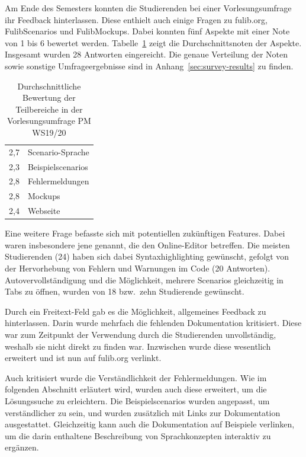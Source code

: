 Am Ende des Semesters konnten die Studierenden bei einer Vorlesungsumfrage ihr Feedback hinterlassen.
Diese enthielt auch einige Fragen zu fulib.org, FulibScenarios und FulibMockups.
Dabei konnten fünf Aspekte mit einer Note von 1 bis 6 bewertet werden.
Tabelle~\ref{tab:survey-results} zeigt die Durchschnittsnoten der Aspekte.
Insgesamt wurden 28 Antworten eingereicht.
Die genaue Verteilung der Noten sowie sonstige Umfrageergebnisse sind in Anhang~\ref{sec:survey-results} zu finden.

\begin{table}
    \caption{Durchschnittliche Bewertung der Teilbereiche in der Vorlesungsumfrage PM WS19/20}
    \label{tab:survey-results}
    \centering
    \begin{tabular}{rl}
        \toprule
        2,7 & Scenario-Sprache \\
        2,3 & Beispielscenarios \\
        2,8 & Fehlermeldungen \\
        2,8 & Mockups \\
        2,4 & Webseite \\
        \bottomrule
    \end{tabular}
\end{table}

Eine weitere Frage befasste sich mit potentiellen zukünftigen Features.
Dabei waren insbesondere jene genannt, die den Online-Editor betreffen.
Die meisten Studierenden (24) haben sich dabei Syntaxhighlighting gewünscht,
gefolgt von der Hervorhebung von Fehlern und Warnungen im Code (20 Antworten).
Autovervollständigung und die Möglichkeit, mehrere Scenarios gleichzeitig in Tabs zu öffnen,
wurden von 18 bzw.\ zehn Studierende gewünscht.

Durch ein Freitext-Feld gab es die Möglichkeit, allgemeines Feedback zu hinterlassen.
Darin wurde mehrfach die fehlenden Dokumentation kritisiert.
Diese war zum Zeitpunkt der Verwendung durch die Studierenden unvollständig,
weshalb sie nicht direkt zu finden war.
Inzwischen wurde diese wesentlich erweitert und ist nun auf fulib.org verlinkt.

Auch kritisiert wurde die Verständlichkeit der Fehlermeldungen.
Wie im folgenden Abschnitt erläutert wird,
wurden auch diese erweitert, um die Lösungssuche zu erleichtern.
Die Beispielscenarios wurden angepasst, um verständlicher zu sein,
und wurden zusätzlich mit Links zur Dokumentation ausgestattet.
Gleichzeitig kann auch die Dokumentation auf Beispiele verlinken,
um die darin enthaltene Beschreibung von Sprachkonzepten interaktiv zu ergänzen.


